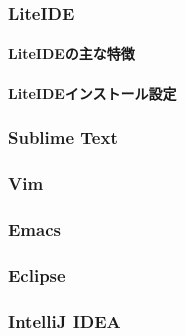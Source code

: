 
\subsubsection{LiteIDE}

\paragraph{LiteIDEの主な特徴}

\paragraph{LiteIDEインストール設定}

\subsubsection{Sublime Text}

\subsubsection{Vim}

\subsubsection{Emacs}

\subsubsection{Eclipse}

\subsubsection{IntelliJ IDEA}

